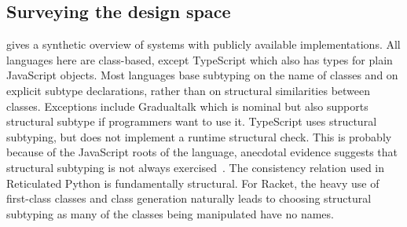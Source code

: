 \documentclass[a4paper,USenglish]{tex/lipics-v2016}
\begin{document}
\subsection{Surveying the design space}

 gives a synthetic overview of systems with publicly available
implementations. All languages here are class-based, except TypeScript which
also has types for plain JavaScript objects. Most languages base subtyping
on the name of classes and on explicit subtype declarations, rather than on
structural similarities between classes.  Exceptions include Gradualtalk
which is nominal but also supports structural subtype if programmers want to
use it.  TypeScript uses structural subtyping, but does not implement a
runtime structural check. This is probably because of the JavaScript roots
of the language, anecdotal evidence suggests that structural subtyping is
not always exercised~\cite{ecoop15}.  The consistency relation used in
Reticulated Python is fundamentally structural.  For Racket, the heavy use
of first-class classes and class generation naturally leads to choosing
structural subtyping as many of the classes being manipulated have no names.


\newcommand{\rot}[1]{\begin{rotate}{80} #1 \end{rotate}}
\newcommand{\X}{\EM{\bullet}}
\newcommand{\XX}{\EM{\bullet^2}}
\newcommand{\XY}{\EM{\bullet^1}}
\end{document}

